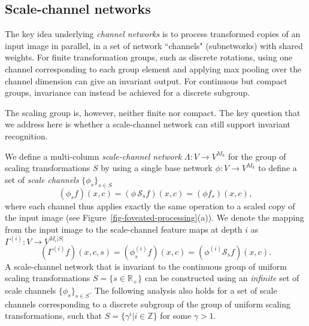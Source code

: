 \documentclass[twocolumn,runningheads]{svjour3}
\def\bbbr{{\mathbb R}}
\def\bbbz{{\mathbb Z}}
\def\calS{\mathcal{S}}
\begin{document}
\subsection{Scale-channel networks}
\label{sec-scale-channel-networks}

The key idea underlying \emph{channel networks} is to process
transformed copies of an input image in parallel, in a set of network
``channels" (subnetworks) with shared weights. For finite
transformation groups, such as discrete rotations, using one channel
corresponding to each group element and applying max pooling over the
channel dimension can give an invariant output. For continuous
but compact groups, invariance can instead be achieved for a discrete
subgroup. 

The scaling group is, however, neither finite nor compact. The key question that we address here
is whether a scale-channel network can still support invariant
recognition. 

We define a multi-column {\em scale-channel network\/} 
$\Lambda: V \to V^{M_k}$
for the group of scaling transformations $S$ by using a single base 
network $\phi: V \to V^{M_k}$ to define a set of {\em scale channels\/} $\{\phi_s \}_{s \in S}$
\begin{equation}
(\phi_s f)(x,c) = (\phi\, \calS_{s} f)(x,c) = (\phi f_s)(x,c),
\label{eq-phi_s-def}
\end{equation}
where each channel thus applies exactly the same operation to 
a scaled copy of the input image (see Figure~\ref{fig-foveated-processing}(a)). 
We denote the mapping from the input image to the scale-channel feature maps at depth $i$ as $\Gamma^{(i)}: V \to V^{M_i |S|}$
\begin{equation}
(\Gamma^{(i)} f)(x,c,s) =  (\phi^{(i)}_s f)(x, c)  = (\phi^{(i)} \calS_s f)(x,c).
\label{eq-gamma_s-def}
\end{equation}
A scale-channel network that is invariant to the continuous group of uniform scaling transformations $S = \{s \in \bbbr_+ \}$ 
can be constructed using an {\em infinite\/} set of scale channels $\{
\phi_s \}_{s \in S}$. The following analysis also holds for a set of
scale channels corresponding to a discrete subgroup of the group of
uniform scaling transformations, such that 
$S = \{\gamma^i |  i \in \bbbz\}$ for some $\gamma > 1$.
\end{document}
